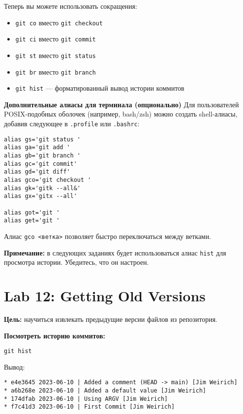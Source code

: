 \documentclass[a4paper,12pt]{report}
\begin{document}
Теперь вы можете использовать сокращения:
\begin{itemize}
  \item \texttt{git co} вместо \texttt{git checkout}
  \item \texttt{git ci} вместо \texttt{git commit}
  \item \texttt{git st} вместо \texttt{git status}
  \item \texttt{git br} вместо \texttt{git branch}
  \item \texttt{git hist} — форматированный вывод истории коммитов
\end{itemize}


\textbf{Дополнительные алиасы для терминала (опционально)}
Для пользователей POSIX-подобных оболочек (например, bash/zsh) можно создать shell-алиасы, добавив следующее в \texttt{.profile} или \texttt{.bashrc}:

\begin{verbatim}
alias gs='git status '
alias ga='git add '
alias gb='git branch '
alias gc='git commit'
alias gd='git diff'
alias gco='git checkout '
alias gk='gitk --all&'
alias gx='gitx --all'

alias got='git '
alias get='git '
\end{verbatim}

Алиас \texttt{gco <ветка>} позволяет быстро переключаться между ветками.


\textbf{Примечание:} в следующих заданиях будет использоваться алиас \texttt{hist} для просмотра истории. Убедитесь, что он настроен.

\section{Lab 12: Getting Old Versions}
\textbf{Цель:} научиться извлекать предыдущие версии файлов из репозитория.

\textbf{Посмотреть историю коммитов:}
\begin{verbatim}
git hist
\end{verbatim}

Вывод:
\begin{verbatim}
* e4e3645 2023-06-10 | Added a comment (HEAD -> main) [Jim Weirich]
* a6b268e 2023-06-10 | Added a default value [Jim Weirich]
* 174dfab 2023-06-10 | Using ARGV [Jim Weirich]
* f7c41d3 2023-06-10 | First Commit [Jim Weirich]
\end{verbatim}
\end{document}
